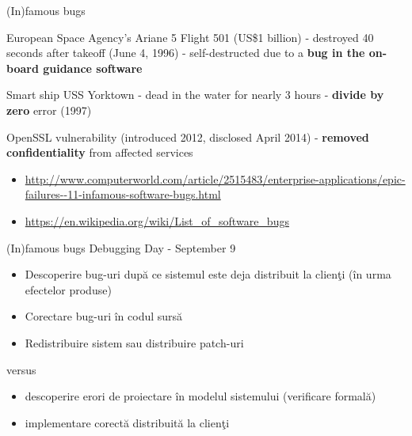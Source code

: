 \documentclass{beamer}
\begin{document}
\begin{frame}{(In)famous bugs}

European Space Agency's Ariane 5 Flight 501 (US\$1 billion) - destroyed 40 seconds after takeoff (June 4, 1996) - self-destructed due to a \textbf{bug in the on-board guidance software}

\vspace{0.5cm}

Smart ship USS Yorktown - dead in the water for nearly 3 hours - \textbf{divide by zero} error (1997)

\vspace{0.5cm}

OpenSSL vulnerability (introduced 2012, disclosed April 2014) - \textbf{removed confidentiality} from affected services

\begin{itemize}
\item
\url{http://www.computerworld.com/article/2515483/enterprise-applications/epic-failures--11-infamous-software-bugs.html}
\item
\url{https://en.wikipedia.org/wiki/List_of_software_bugs}
\end{itemize}

\end{frame}



\begin{frame}{(In)famous bugs}
Debugging Day - September 9

\vspace{0.5cm}

\begin{itemize}
\item
Descoperire bug-uri după ce sistemul este deja distribuit la clienţi (în urma efectelor produse)
\item
Corectare bug-uri în codul sursă
\item
Redistribuire sistem sau distribuire patch-uri
\end{itemize}

versus

\begin{itemize}
\item
descoperire erori de proiectare în modelul sistemului (verificare formală)
\item
implementare corectă distribuită la clienţi
\end{itemize}
\end{frame}
\end{document}
